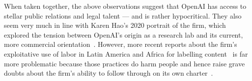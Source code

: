 When taken together, the above observations suggest that OpenAI has access to
stellar public relations and legal talent --- and is rather hypocritical. They
also seem very much in line with Karen Hao's 2020 portrait of the firm, which
explored the tension between OpenAI's origin as a research lab and its current,
more commercial orientation~\cite{Hao2020}. However, more recent reports about
the firm's exploitative use of labor in Latin America and Africa for labelling
content~\cite{HaoHernandez2022,Perrigo2023a} is far more problematic because
those practices do harm people and hence raise grave doubts about the firm's
ability to follow through on its own charter~\cite{OpenAI2018}.
